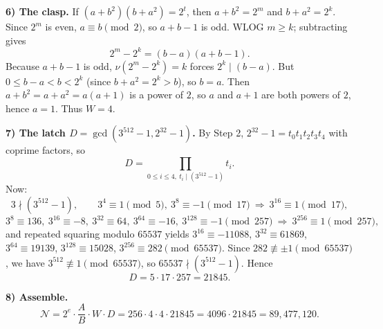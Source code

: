 \textbf{6) The clasp.}
If \((a+b^2)(b+a^2)=2^t\), then \(a+b^2=2^m\) and \(b+a^2=2^k\).
Since \(2^m\) is even, \(a\equiv b\pmod 2\), so \(a+b-1\) is odd. WLOG \(m\ge k\); subtracting gives
\[
2^m-2^k=(b-a)(a+b-1).
\]
Because \(a+b-1\) is odd, \(\nu(2^m-2^k)=k\) forces \(2^k\mid (b-a)\).
But \(0\le b-a<b<2^k\) (since \(b+a^2=2^k>b\)), so \(b=a\).
Then \(a+b^2=a+a^2=a(a+1)\) is a power of \(2\), so \(a\) and \(a+1\) are both powers of \(2\), hence \(a=1\).
Thus \(W=4\).

\textbf{7) The latch \(D=\gcd(3^{512}-1,2^{32}-1)\).}
By Step 2, \(2^{32}-1=t_0t_1t_2t_3t_4\) with coprime factors, so
\[
D=\prod_{0\le i\le 4,\ t_i\mid(3^{512}-1)} t_i.
\]
Now:
\[
3\nmid(3^{512}-1),\qquad 3^4\equiv 1\pmod 5, \ 3^8\equiv -1\pmod{17}\ \Rightarrow\ 3^{16}\equiv 1\pmod{17},
\] 
\[
3^8\equiv 136,\ 3^{16}\equiv -8,\ 3^{32}\equiv 64,\ 3^{64}\equiv -16,\ 3^{128}\equiv -1\pmod{257}\ \Rightarrow\ 3^{256}\equiv 1\pmod{257},
\]
and repeated squaring modulo \(65537\) yields \(3^{16}\equiv -11088\), \(3^{32}\equiv 61869\), \(3^{64}\equiv 19139\), \(3^{128}\equiv 15028\), \(3^{256}\equiv 282\pmod{65537}\). Since \(282\not\equiv \pm 1\pmod{65537}\), we have \(3^{512}\not\equiv 1\pmod{65537}\), so \(65537\nmid(3^{512}-1)\).
Hence
\[
D=5\cdot 17\cdot 257=21845.
\]

\textbf{8) Assemble.}
\[
\mathcal N=2^e\cdot \frac{A}{B}\cdot W\cdot D
=256\cdot 4\cdot 4\cdot 21845
=4096\cdot 21845
=89{,}477{,}120.
\]



\NextPage
